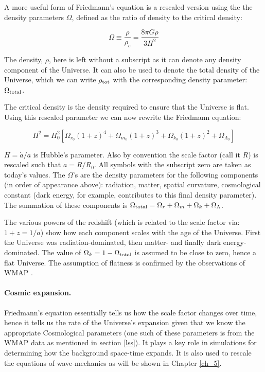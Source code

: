 A more useful form of Friedmann's equation is a rescaled version using the the density parameters $\Omega$, defined as the ratio of density to the critical density:

\begin{equation}
\Omega \equiv \frac{\rho}{\rho_c} = \frac{8\pi G\rho}{3H^2}
\end{equation}

\noindent The density, $\rho$, here is left without a subscript as it can denote any density component of the Universe. It can also be used to denote the total density of the Universe, which we can write $\rho_{\rm tot}$ with the corresponding density parameter: $\Omega_{\rm total}$.

The critical density is the density required to ensure that the Universe is flat. Using this rescaled parameter we can now rewrite the Friedmann equation:

\begin{equation}
\label{eqn_fdmn}
H^2 = H_0^2 \left[\Omega_{r_0} (1 + z)^4 + \Omega_{m_0} (1 + z)^3 + \Omega_{k_0}(1 + z)^2 + \Omega_{\Lambda_0} \right]
\end{equation}

\noindent $H = \dot a/a$ is Hubble's parameter. Also by convention the scale factor (call it $R$) is rescaled such that $a = R/R_0$. All symbols with the subscript zero are taken as today's values. The $\Omega$'s are the density parameters for the following components (in order of appearance above): radiation, matter, spatial curvature, cosmological constant (dark energy, for example, contributes to this final density parameter). The summation of these components is $\Omega_{\rm total} = \Omega_{r} + \Omega_{m} + \Omega_{k} + \Omega_{\Lambda}$.

The various powers of the redshift (which is related to the scale factor via: $1 + z = 1/a$) show how each component scales with the age of the Universe. First the Universe was radiation-dominated, then matter- and finally dark energy-dominated. The value of $\Omega_{k} = 1 - \Omega_{\rm total}$ is assumed to be close to zero, hence a flat Universe. The assumption of flatness is confirmed by the observations of WMAP \citep{bib_wmap}.

\paragraph{Cosmic expansion.}Friedmann's equation essentially tells us how the scale factor changes over time, hence it tells us the rate of the Universe's expansion given that we know the appropriate Cosmological parameters (one such of these parameters is from the WMAP data as mentioned in section \ref{lss}). It plays a key role in simulations for determining how the background space-time expands. It is also used to rescale the equations of wave-mechanics as will be shown in Chapter \ref{ch_5}.


